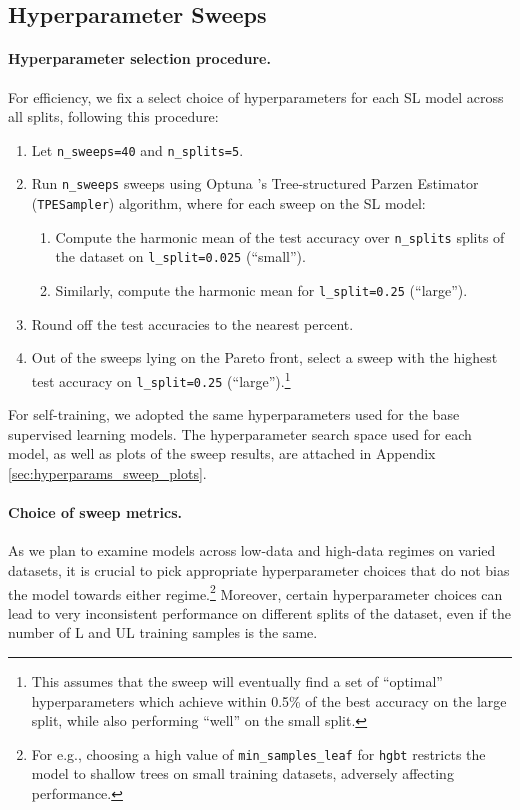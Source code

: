 \documentclass{article}
\begin{document}
\subsection{Hyperparameter Sweeps}

\paragraph{Hyperparameter selection procedure.}
For efficiency, we fix a select choice of hyperparameters for each SL model across all
splits, following this procedure: \begin{enumerate}
  \item Let \texttt{n\_sweeps=40} and \texttt{n\_splits=5}.
  \item Run \texttt{n\_sweeps} sweeps using Optuna \cite{akiba2019optuna}'s
  Tree-structured Parzen Estimator (\texttt{TPESampler}) algorithm, where for each sweep
  on the SL model:
  \begin{enumerate}
    \item Compute the harmonic mean of the test accuracy over \texttt{n\_splits} splits
    of the dataset on \texttt{l\_split=0.025} (``small'').
    \item Similarly, compute the harmonic mean for \texttt{l\_split=0.25} (``large'').
  \end{enumerate}
  \item Round off the test accuracies to the nearest percent.
  \item Out of the sweeps lying on the Pareto front, select a sweep with the highest
  test accuracy on \texttt{l\_split=0.25} (``large'').\footnote{%
    This assumes that the sweep will eventually find a set of ``optimal''
    hyperparameters which achieve within 0.5\% of the best accuracy on the large split,
    while also performing ``well'' on the small split.
  }
\end{enumerate}
For self-training, we adopted the same hyperparameters used for the base supervised
learning models.
The hyperparameter search space used for each model, as well as plots of the sweep
results, are attached in Appendix \ref{sec:hyperparams_sweep_plots}.

\paragraph{Choice of sweep metrics.}
As we plan to examine models across low-data and high-data regimes on varied datasets,
it is crucial to pick appropriate hyperparameter choices that do not bias the model
towards either regime.\footnote{%
  For e.g., choosing a high value of \texttt{min\_samples\_leaf} for \texttt{hgbt}
  restricts the model to shallow trees on small training datasets, adversely affecting
  performance.
} Moreover, certain hyperparameter choices can lead to very inconsistent performance on
different splits of the dataset, even if the number of L and UL training samples is the
same.
\end{document}

